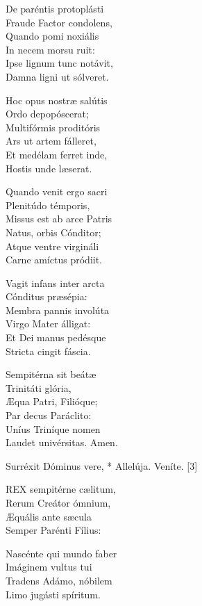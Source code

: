 De paréntis protoplásti\\
Fraude Factor condolens,\\
Quando pomi noxiális\\
In necem morsu ruit:\\
Ipse lignum tunc notávit,\\
Damna ligni ut sólveret.

Hoc opus nostræ salútis\\
Ordo depopóscerat;\\
Multifórmis proditóris\\
Ars ut artem fálleret,\\
Et medélam ferret inde,\\
Hostis unde læserat.

Quando venit ergo sacri\\
Plenitúdo témporis,\\
Missus est ab arce Patris\\
Natus, orbis Cónditor;\\
Atque ventre virgináli\\
Carne amíctus pródiit.

Vagit infans inter arcta\\
Cónditus præsépia:\\
Membra pannis involúta\\
Virgo Mater álligat:\\
Et Dei manus pedésque\\
Stricta cingit fáscia.

Sempitérna sit beátæ\\
Trinitáti glória,\\
Æqua Patri, Filióque;\\
Par decus Paráclito:\\
Uníus Triníque nomen\\
Laudet univérsitas. Amen.


 Surréxit Dóminus vere, * Allelúja.  Veníte. [3]


\lettrine[lines=2]{R}{EX} sempitérne cælitum,\\
Rerum Creátor ómnium,\\
Æquális ante sæcula\\
Semper Parénti Fílius:

Nascénte qui mundo faber\\
Imáginem vultus tui\\
Tradens Adámo, nóbilem\\
Limo jugásti spíritum.

